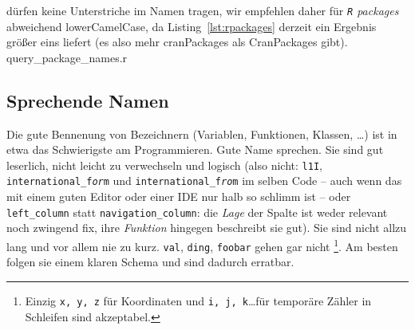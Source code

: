 \documentclass[twoside]{scrreprt}
\providecommand{\R}{\texttt{R}}
\providecommand{\code}[1]{\texttt{#1}}
\begin{document}
 d\"urfen keine Unterstriche im Namen 
tragen, wir
empfehlen daher f\"u{}r \emph{\R{} packages} abweichend lowerCamelCase, 
da Listing~\ref{lst:rpackages} derzeit ein Ergebnis gr\"o{}\ss{}er eins 
liefert (es also mehr cranPackages als CranPackages gibt).
%
{query_package_names.r}

\subsection{Sprechende Namen}
Die gute Bennenung von Bezeichnern (Variablen, Funktionen, Klassen, \ldots)
ist in etwa
das Schwierigste am Programmieren. Gute Name sprechen. Sie sind gut leserlich,
nicht leicht zu verwechseln und logisch (also nicht: \code{l1I},
\code{international\_f\emph{or}m} und \code{international\_f\emph{ro}m} im 
selben Code -- auch wenn das mit einem guten Editor oder einer IDE nur halb so 
schlimm ist -- oder \code{left\_column} statt \code{navigation\_column}: die 
\emph{Lage} der Spalte ist weder relevant noch zwingend fix, ihre 
\emph{Funktion} hingegen beschreibt sie gut).
Sie sind nicht allzu lang und vor allem nie zu kurz.
\code{val}, \code{ding}, \code{foobar} gehen gar nicht%
\footnote{Einzig \code{x, y, z} f\"ur Koordinaten
  und \code{i, j, k}\ldots f\"ur tempor\"a{}re Z\"a{}hler in Schleifen sind
  akzeptabel.}.
Am besten folgen sie einem klaren Schema und sind dadurch erratbar.
\end{document}
